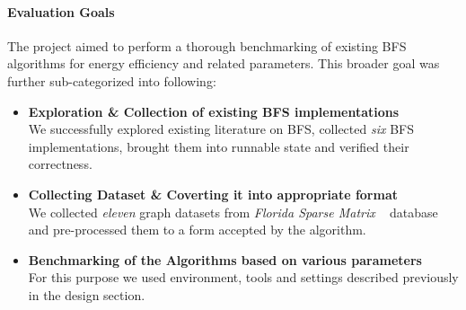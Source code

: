 \paragraph{Evaluation Goals}
The project aimed to perform a thorough benchmarking of existing BFS algorithms
for energy efficiency and related parameters. This broader goal was further
sub-categorized into following:
\begin{itemize}
\item
\textbf{Exploration \& Collection of existing BFS implementations}\\
We successfully explored existing literature on BFS, collected \emph{six} 
BFS implementations, brought them into runnable state and verified their 
correctness.
\item
\textbf{Collecting Dataset \& Coverting it into appropriate format}\\
We collected \emph{eleven} graph datasets from
\emph{Florida Sparse Matrix} ~\cite{FLORIDA-SPARSE} database and pre-processed 
them to a form accepted by the algorithm.
\item
\textbf{Benchmarking of the Algorithms based on various parameters}\\
For this purpose we used environment, tools and settings described previously
in the design section.
\end{itemize}

